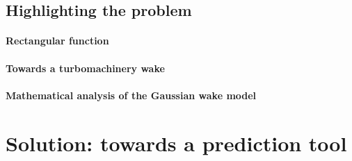 

\subsection{Highlighting the problem}

\paragraph{Rectangular function}

\paragraph{Towards a turbomachinery wake}
\label{sec:turbomachine_wake}

\paragraph{Mathematical analysis of the Gaussian wake model}
\label{sec:analytical_considerations}

\section{Solution: towards a prediction tool}
\label{sec:CROR}
